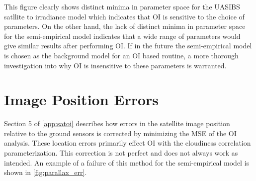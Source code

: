 This figure clearly shows distinct minima in parameter space for the
UASIBS satllite to irradiance model which indicates that  OI is
sensitive to the choice of parameters.
On the other hand, the lack of distinct minima in parameter space for
the semi-empirical model indicates that a wide range of parameters would
give similar results after performing OI.
If in the future the semi-empirical model is chosen as the background model
for an OI based routine, a more thorough investigation into why OI is
insensitive to these parameters is warranted.


\section{Image Position Errors}
Section 5 of \cref{app:satoi} describes how errors in the satellite
image position relative to the ground sensors is corrected by
minimizing the MSE of the OI analysis.
These location errors primarily effect OI with the cloudiness
correlation parameterization.
This correction is not perfect and does not always work as intended.
An example of a failure of this method for the semi-empirical model is
shown in \cref{fig:parallax_err}.


